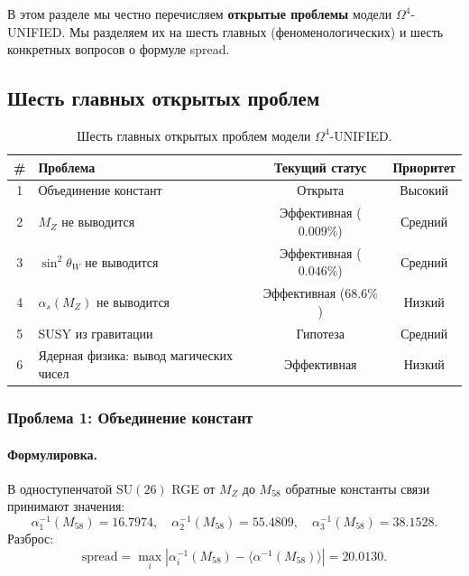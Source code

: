 \documentclass[11pt,a4paper]{article}
\newcommand{\SU}{\ensuremath{\mathrm{SU}}}
\newcommand{\Om}{\ensuremath{\Omega^4}}
\theoremstyle{definition}
\begin{document}
В этом разделе мы честно перечисляем \textbf{открытые проблемы}
модели $\Om$-UNIFIED. Мы разделяем их на шесть главных
(феноменологических) и шесть конкретных вопросов о формуле
spread.

\subsection{Шесть главных открытых проблем}
\label{subsec:open-six}

\begin{table}[ht]
\centering
\caption{Шесть главных открытых проблем модели \texorpdfstring{$\Om$}{}-UNIFIED.}
\label{tab:six-open-problems}
\begin{tabular}{clcc}
\toprule
\# & Проблема & Текущий статус & Приоритет \\
\midrule
1 & Объединение констант & Открыта & Высокий \\
2 & $M_Z$ не выводится & Эффективная ($0.009\%$) & Средний \\
3 & $\sin^2\theta_W$ не выводится & Эффективная ($0.046\%$) & Средний \\
4 & $\alpha_s(M_Z)$ не выводится & Эффективная ($68.6\%$) & Низкий \\
5 & SUSY из гравитации & Гипотеза & Средний \\
6 & Ядерная физика: вывод магических чисел & Эффективная & Низкий \\
\bottomrule
\end{tabular}
\end{table}

\subsubsection{Проблема 1: Объединение констант}

\paragraph{Формулировка.}
В одноступенчатой $\SU(26)$ RGE от $M_Z$ до $M_{58}$
обратные константы связи принимают значения:
\begin{equation}
    \alpha_1^{-1}(M_{58}) = 16.7974, \quad
    \alpha_2^{-1}(M_{58}) = 55.4809, \quad
    \alpha_3^{-1}(M_{58}) = 38.1528.
\end{equation}
Разброс:
\begin{equation}
    \text{spread} = \max_i |\alpha_i^{-1}(M_{58})
    - \langle \alpha^{-1}(M_{58}) \rangle| = 20.0130.
\end{equation}
\end{document}
